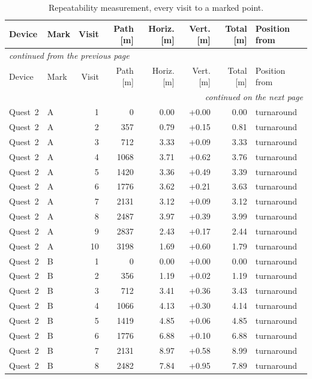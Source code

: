 {\footnotesize\setlength{\tabcolsep}{5pt}
\begin{longtable}{llrrrrrl}
\caption{Repeatability measurement, every visit to a marked point.}\label{tab:S7}\\
\toprule
Device & Mark & Visit & Path [m] & Horiz. [m] & Vert. [m] & Total [m] & Position from \\
\midrule
\endfirsthead
\multicolumn{8}{l}{\footnotesize\itshape continued from the previous page}\\
\toprule
Device & Mark & Visit & Path [m] & Horiz. [m] & Vert. [m] & Total [m] & Position from \\
\midrule
\endhead
\midrule
\multicolumn{8}{r}{\footnotesize\itshape continued on the next page}\\
\endfoot
\bottomrule
\endlastfoot
Quest~2 & A & 1 & 0 & 0.00 & +0.00 & 0.00 & turnaround \\
Quest~2 & A & 2 & 357 & 0.79 & +0.15 & 0.81 & turnaround \\
Quest~2 & A & 3 & 712 & 3.33 & +0.09 & 3.33 & turnaround \\
Quest~2 & A & 4 & 1068 & 3.71 & +0.62 & 3.76 & turnaround \\
Quest~2 & A & 5 & 1420 & 3.36 & +0.49 & 3.39 & turnaround \\
Quest~2 & A & 6 & 1776 & 3.62 & +0.21 & 3.63 & turnaround \\
Quest~2 & A & 7 & 2131 & 3.12 & +0.09 & 3.12 & turnaround \\
Quest~2 & A & 8 & 2487 & 3.97 & +0.39 & 3.99 & turnaround \\
Quest~2 & A & 9 & 2837 & 2.43 & +0.17 & 2.44 & turnaround \\
Quest~2 & A & 10 & 3198 & 1.69 & +0.60 & 1.79 & turnaround \\
\addlinespace
Quest~2 & B & 1 & 0 & 0.00 & +0.00 & 0.00 & turnaround \\
Quest~2 & B & 2 & 356 & 1.19 & +0.02 & 1.19 & turnaround \\
Quest~2 & B & 3 & 712 & 3.41 & +0.36 & 3.43 & turnaround \\
Quest~2 & B & 4 & 1066 & 4.13 & +0.30 & 4.14 & turnaround \\
Quest~2 & B & 5 & 1419 & 4.85 & +0.06 & 4.85 & turnaround \\
Quest~2 & B & 6 & 1776 & 6.88 & +0.10 & 6.88 & turnaround \\
Quest~2 & B & 7 & 2131 & 8.97 & +0.58 & 8.99 & turnaround \\
Quest~2 & B & 8 & 2482 & 7.84 & +0.95 & 7.89 & turnaround \\

\end{longtable}}
